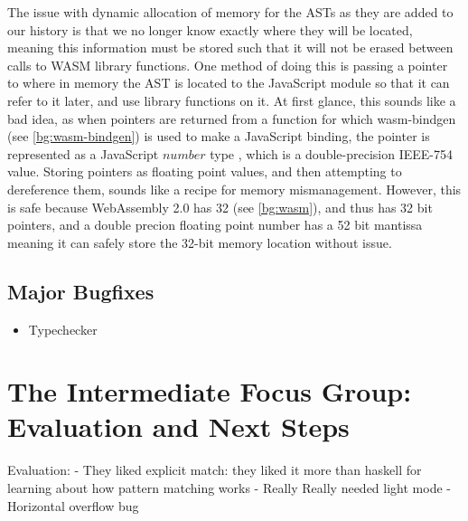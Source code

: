 The issue with dynamic allocation of memory for the \ac{AST}s as they are added to our history is that we no longer know exactly where they will be located, meaning this information must be stored such that it will not be erased between calls to \ac{WASM} library functions. One method of doing this is passing a pointer to where in memory the AST is located to the JavaScript module so that it can refer to it later, and use library functions on it. At first glance, this sounds like a bad idea, as when pointers are returned from a function for which wasm-bindgen (see \ref{bg:wasm-bindgen}) is used to make a JavaScript binding, the pointer is represented as a JavaScript $number$ type \cite{wasm_bindgen_guide}, which is a double-precision IEEE-754 value\cite{ecma262number}. Storing pointers as floating point values, and then attempting to dereference them, sounds like a recipe for memory mismanagement. However, this is safe because WebAssembly 2.0 has 32 (see \ref{bg:wasm}), and thus has 32 bit pointers, and a double precion floating point number has a 52 bit  \cite{ieee754} mantissa meaning it can safely store the 32-bit memory location without issue. 

\subsection{Major Bugfixes}
\begin{itemize}
    \item Typechecker
\end{itemize}

\section{The Intermediate Focus Group: Evaluation and Next Steps}
\label{eval:IFG}
Evaluation:
- They liked explicit match: they liked it more than haskell for learning about how pattern matching works
- Really Really needed light mode
- Horizontal overflow bug